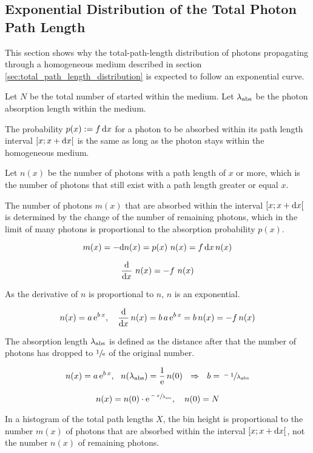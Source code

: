 \subsection{Exponential Distribution of the Total Photon Path Length}
\label{sec:exponential_distribution}

This section shows why the total-path-length distribution of photons
propagating through a homogeneous medium described in section
\ref{sec:total_path_length_distribution} is expected to follow an
exponential curve.

Let \(N\) be the total number of started within the medium. Let
\(\lambda_\text{abs}\) be the photon absorption length within the medium.

The probability \(p(x):=f\,\text{d} x\) for a photon to be absorbed within its
path length interval \([x; x + \text{d} x[\) is the same as long as the photon
stays within the homogeneous medium.

Let \(n(x)\) be the number of photons with a path length of \(x\) or
more, which is the number of photons that still exist with a path length
greater or equal \(x\).

The number of photons \(m(x)\) that are absorbed within the interval
\([x; x + \text{d} x[\) is determined by the change of the number of remaining
photons, which in the limit of many photons is proportional to the
absorption probability \(p(x)\).

\[ m(x) = -\text{d} n(x) = p(x)\ n(x) = f\,\text{d} x\,n(x) \]

\[ \frac{\d}{\dx}\ n(x) = -f\ n(x) \]

As the derivative of \(n\) is proportional to \(n\), \(n\) is an
exponential.

\[
  n(x) = a\,\mathrm{e}^{b\,x}, \ \ \
  \frac{\text{d}}{\text{d} x}\,n(x) = b\,a\,\mathrm{e}^{b\,x} = b\,n(x) = -f\,n(x)
\]

The absorption length \(\lambda_\text{abs}\) is defined as the distance after
that the number of photons has dropped to \(\sfrac{1}{\mathrm{e}}\) of the
original number.

\[
  n(x) = a\,\mathrm{e}^{b\,x}, \ \
  n(\lambda_\text{abs}) = \frac{1}{\mathrm{e}}\, n(0)
  \ \ \Rightarrow \ \
  b = \sfrac{-1}{\lambda_\text{abs}}
\]

\[
  n(x) = n(0) \cdot \mathrm{e}^{\sfrac{-x}{\lambda_\text{abs}}}, \ \ \ n(0) = N
\]

In a histogram of the total path lengths \(X\), the bin height is
proportional to the number \(m(x)\) of photons that are absorbed within
the interval \([x; x + \text{d} x[\), not the number \(n(x)\) of remaining
photons.

